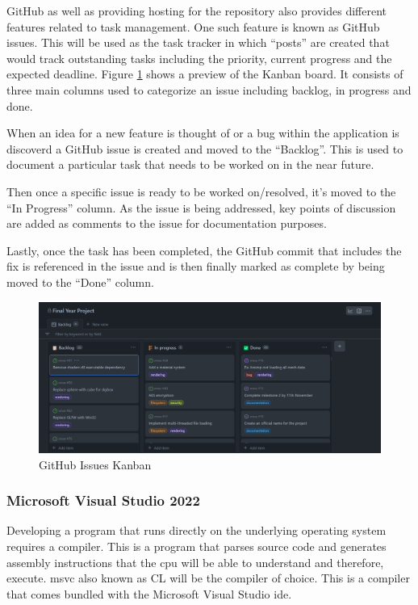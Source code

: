 \documentclass[11pt]{article}
\begin{document}
GitHub as well as providing hosting for the repository also provides different
features related to task management. One such feature is known as GitHub issues.
This will be used as the task tracker in which ``posts'' are created that would
track outstanding tasks including the priority, current progress and the
expected deadline. Figure \ref{fig:github_kanban} shows a preview of the Kanban
board. It consists of three main columns used to categorize an issue including
backlog, in progress and done. 

When an idea for a new feature is thought of or a bug within the application is
discoverd a GitHub issue is created and moved to the ``Backlog''. This is used
to document a particular task that needs to be worked on in the near future.

Then once a specific issue is ready to be worked on/resolved, it's moved to the
``In Progress'' column. As the issue is being addressed, key points of discussion
are added as comments to the issue for documentation purposes.

Lastly, once the task has been completed, the GitHub commit that includes the
fix is referenced in the issue and is then finally marked as complete by being
moved to the ``Done'' column.

\begin{figure}[h!]
  \centering
  \includegraphics[width=\textwidth]{images/github_project.png}
  \caption{GitHub Issues Kanban}
  \label{fig:github_kanban}
\end{figure}

\subsubsection{Microsoft Visual Studio 2022}
Developing a program that runs directly on the underlying operating system
requires a compiler. This is a program that parses source code and generates
assembly instructions that the \gls{cpu} will be able to understand and
therefore, execute. \gls{msvc} also known as CL will be the compiler of choice.
This is a compiler that comes bundled with the Microsoft Visual Studio
\gls{ide}.
\end{document}
